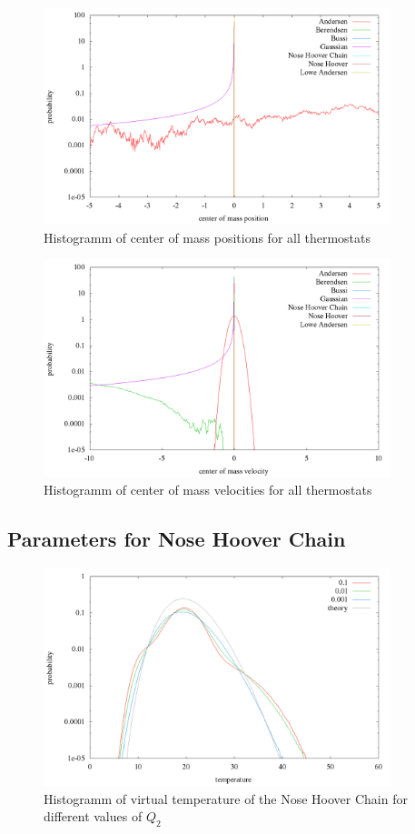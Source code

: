 \begin{figure}[H]
\centering
\includegraphics[width=0.9\textwidth]{./graphics/Histogramm_schwerPos_one_T=20_p=64.png}
\caption{Histogramm of center of mass positions for all thermostats}
\label{im:schwerPos_one}
\end{figure} 

\begin{figure}[H]
\centering
\includegraphics[width=0.9\textwidth]{./graphics/Histogramm_schwerVel_one_T=20_p=64.png}
\caption{Histogramm of center of mass velocities for all thermostats}
\label{im:schwerVel_one}
\end{figure} 

\subsection{Parameters for Nose Hoover Chain}

\begin{figure}[H]
\centering
\includegraphics[width=0.9\textwidth]{./graphics/Histogramm_tempCol_one_Chain.png}
\caption{Histogramm of virtual temperature of the Nose Hoover Chain for different values of $Q_2$ }
\label{im:temp_one}
\end{figure}



